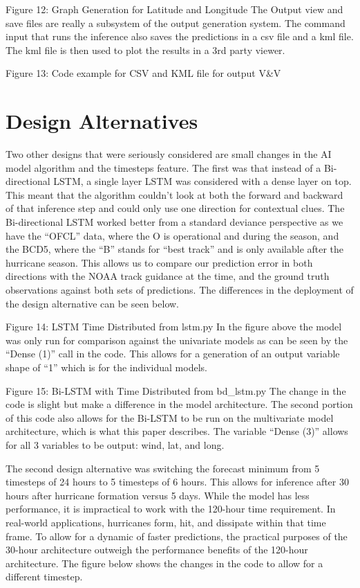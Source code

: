\documentclass{article}
\begin{document}
Figure 12: Graph Generation for Latitude and Longitude
The Output view and save files are really a subsystem of the output generation system. The command input that runs the inference also saves the predictions in a csv file and a kml file. The kml file is then used to plot the results in a 3rd party viewer. 


Figure 13: Code example for CSV and KML file for output V\&V

\section{Design Alternatives}
Two other designs that were seriously considered are small changes in the AI model algorithm and the timesteps feature. The first was that instead of a Bi-directional LSTM, a single layer LSTM was considered with a dense layer on top. This meant that the algorithm couldn’t look at both the forward and backward of that inference step and could only use one direction for contextual clues. The Bi-directional LSTM worked better from a standard deviance perspective as we have the “OFCL” data, where the O is operational and during the season, and the BCD5, where the “B” stands for “best track” and is only available after the hurricane season. This allows us to compare our prediction error in both directions with the NOAA track guidance at the time, and the ground truth observations against both sets of predictions. The differences in the deployment of the design alternative can be seen below.

Figure 14: LSTM Time Distributed from lstm.py
In the figure above the model was only run for comparison against the univariate models as can be seen by the “Dense (1)” call in the code. This allows for a generation of an output variable shape of “1” which is for the individual models.


Figure 15: Bi-LSTM with Time Distributed from bd\_lstm.py
The change in the code is slight but make a difference in the model architecture. The second portion of this code also allows for the Bi-LSTM to be run on the multivariate model architecture, which is what this paper describes. The variable “Dense (3)” allows for all 3 variables to be output: wind, lat, and long.

The second design alternative was switching the forecast minimum from 5 timesteps of 24 hours to 5 timesteps of 6 hours. This allows for inference after 30 hours after hurricane formation versus 5 days. While the model has less performance, it is impractical to work with the 120-hour time requirement. In real-world applications, hurricanes form, hit, and dissipate within that time frame. To allow for a dynamic of faster predictions, the practical purposes of the 30-hour architecture outweigh the performance benefits of the 120-hour architecture. The figure below shows the changes in the code to allow for a different timestep.
\end{document}
